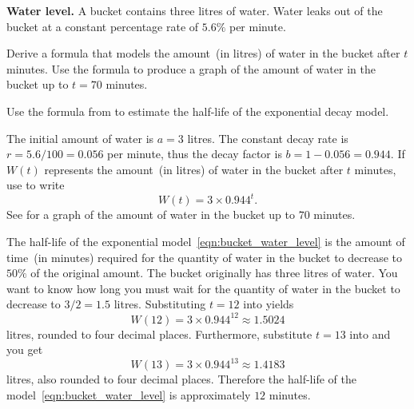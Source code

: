 \documentclass[a4paper,oneside,12pt]{article}
\begin{document}
\begin{example}
\label{eg:water_level}
\textbf{Water level.}
A bucket contains three litres of water.  Water leaks out of the
bucket at a constant percentage rate of $5.6\%$ per minute.
\begin{packedenum}
\item\label{subex:water_level_formula}
  Derive a formula that models the amount~(in litres) of water in the
  bucket after $t$ minutes.  Use the formula to produce a graph of the
  amount of water in the bucket up to $t = 70$ minutes.

\item\label{subex:water_level_half_life}
  Use the formula from  to estimate
  the half-life of the exponential decay model.
\end{packedenum}
\end{example}

\begin{solution}
The initial amount of water is $a = 3$ litres.  The constant decay
rate is $r = 5.6 / 100 = 0.056$ per minute, thus the decay factor is
$b = 1 - 0.056 = 0.944$.  If $W(t)$ represents the amount~(in litres)
of water in the bucket after $t$ minutes, use
 to write
\begin{equation}
\label{eqn:bucket_water_level}
W(t)
=
3 \times 0.944^t.
\end{equation}
See  for a graph of the amount of water
in the bucket up to $70$ minutes.

The half-life of the exponential model~\eqref{eqn:bucket_water_level}
is the amount of time~(in minutes) required for the quantity of water
in the bucket to decrease to $50\%$ of the original amount.  The
bucket originally has three litres of water.  You want to know how
long you must wait for the quantity of water in the bucket to decrease
to $3 / 2 = 1.5$ litres.  Substituting $t = 12$ into
 yields
\[
W(12)
=
3 \times 0.944^{12}
\approx
1.5024
\]
litres, rounded to four decimal places.  Furthermore, substitute
$t = 13$ into  and you get
\[
W(13)
=
3 \times 0.944^{13}
\approx
1.4183
\]
litres, also rounded to four decimal places.  Therefore the half-life
of the model~\eqref{eqn:bucket_water_level} is approximately $12$
minutes.
\end{solution}
\end{document}
